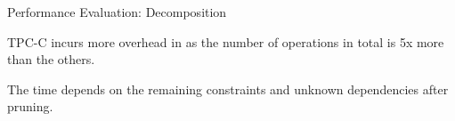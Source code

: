 


\begin{frame}{Performance Evaluation: Decomposition}
	\begin{center}
		TPC-C incurs more overhead in 
		as the number of operations in total is 5x more than the others.

		\vspace{0.30cm}
		\vspace{0.20cm}

		The  time depends on the remaining constraints
		and unknown dependencies {after pruning}.
	\end{center}
\end{frame}

